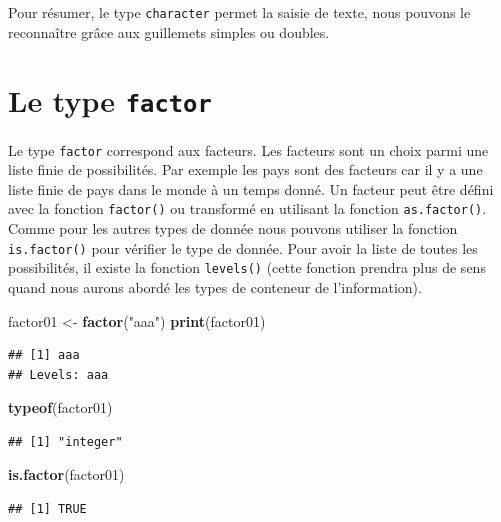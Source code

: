 \documentclass[]{book}
\newenvironment{Shaded}{\begin{snugshade}}{\end{snugshade}}
\newcommand{\KeywordTok}[1]{\textcolor[rgb]{0.13,0.29,0.53}{\textbf{#1}}}
\newcommand{\StringTok}[1]{\textcolor[rgb]{0.31,0.60,0.02}{#1}}
\newcommand{\NormalTok}[1]{#1}
\begin{document}
Pour résumer, le type \texttt{character} permet la saisie de texte, nous
pouvons le reconnaître grâce aux guillemets simples ou doubles.

\section{\texorpdfstring{Le type
\texttt{factor}}{Le type factor}}\label{le-type-factor}

Le type \texttt{factor} correspond aux facteurs. Les facteurs sont un
choix parmi une liste finie de possibilités. Par exemple les pays sont
des facteurs car il y a une liste finie de pays dans le monde à un temps
donné. Un facteur peut être défini avec la fonction \texttt{factor()} ou
transformé en utilisant la fonction \texttt{as.factor()}. Comme pour les
autres types de donnée nous pouvons utiliser la fonction
\texttt{is.factor()} pour vérifier le type de donnée. Pour avoir la
liste de toutes les possibilités, il existe la fonction
\texttt{levels()} (cette fonction prendra plus de sens quand nous aurons
abordé les types de conteneur de l'information).

\begin{Shaded}
\begin{Highlighting}[]
\NormalTok{factor01 <-}\StringTok{ }\KeywordTok{factor}\NormalTok{(}\StringTok{"aaa"}\NormalTok{)}
\KeywordTok{print}\NormalTok{(factor01)}
\end{Highlighting}
\end{Shaded}

\begin{verbatim}
## [1] aaa
## Levels: aaa
\end{verbatim}

\begin{Shaded}
\begin{Highlighting}[]
\KeywordTok{typeof}\NormalTok{(factor01)}
\end{Highlighting}
\end{Shaded}

\begin{verbatim}
## [1] "integer"
\end{verbatim}

\begin{Shaded}
\begin{Highlighting}[]
\KeywordTok{is.factor}\NormalTok{(factor01)}
\end{Highlighting}
\end{Shaded}

\begin{verbatim}
## [1] TRUE
\end{verbatim}
\end{document}
